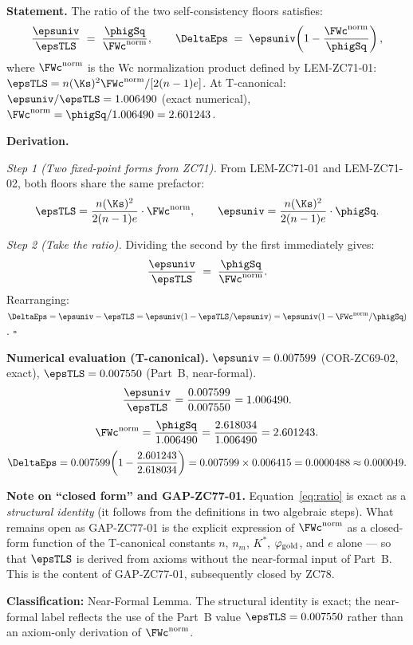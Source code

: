 \documentclass[12pt, a4paper]{article}
\begin{document}

\begin{formalbox}[title={LEM-ZC77-01: Two-Layer Floor Structural Form
  ($R_0$, Near-Formal)}]

\textbf{Statement.}
The ratio of the two self-consistency floors satisfies:
\begin{equation}
  \frac{\epsuniv}{\epsTLS}
  \;=\; \frac{\phigSq}{\FWc^{\rm norm}},
  \qquad
  \DeltaEps \;=\; \epsuniv\!\left(1 - \frac{\FWc^{\rm norm}}{\phigSq}\right),
  \label{eq:ratio}
\end{equation}
where $\FWc^{\rm norm}$ is the Wc normalization product defined by
LEM-ZC71-01: $\epsTLS = n(\Ks)^2\FWc^{\rm norm}/[2(n-1)e]$.
At T-canonical: $\epsuniv/\epsTLS = 1.006490$ (exact numerical),
$\FWc^{\rm norm} = \phigSq / 1.006490 = 2.601243$.

\textbf{Derivation.}

\textit{Step 1 (Two fixed-point forms from ZC71).}
From LEM-ZC71-01 and LEM-ZC71-02, both floors share the same prefactor:
\[
  \epsTLS  = \frac{n(\Ks)^2}{2(n-1)e}\cdot\FWc^{\rm norm},
  \qquad
  \epsuniv = \frac{n(\Ks)^2}{2(n-1)e}\cdot\phigSq.
\]

\textit{Step 2 (Take the ratio).}
Dividing the second by the first immediately gives:
\begin{equation}
  \frac{\epsuniv}{\epsTLS} \;=\; \frac{\phigSq}{\FWc^{\rm norm}}.
  \label{eq:ratio-step2}
\end{equation}
Rearranging: $\DeltaEps = \epsuniv - \epsTLS
= \epsuniv(1 - \epsTLS/\epsuniv)
= \epsuniv(1 - \FWc^{\rm norm}/\phigSq)$. \hfill$\square$

\textbf{Numerical evaluation (T-canonical).}
$\epsuniv = 0.007599$ (COR-ZC69-02, exact),
$\epsTLS = 0.007550$ (Part~B, near-formal).
\[
  \frac{\epsuniv}{\epsTLS} = \frac{0.007599}{0.007550} = 1.006490.
\]
\[
  \FWc^{\rm norm} = \frac{\phigSq}{1.006490}
  = \frac{2.618034}{1.006490} = 2.601243.
\]
\[
  \DeltaEps = 0.007599\!\left(1 - \frac{2.601243}{2.618034}\right)
  = 0.007599 \times 0.006415 = 0.0000488 \approx 0.000049.
\]

\textbf{Note on ``closed form'' and GAP-ZC77-01.}
Equation~\eqref{eq:ratio} is exact as a \emph{structural identity}
(it follows from the definitions in two algebraic steps).
What remains open as GAP-ZC77-01 is the explicit expression of
$\FWc^{\rm norm}$ as a closed-form function of the T-canonical constants
$n$, $n_m$, $K^*$, $\varphi_{\rm gold}$, and $e$ alone --- so that
$\epsTLS$ is derived from axioms without the near-formal input of
Part~B. This is the content of GAP-ZC77-01, subsequently closed
by ZC78.

\textbf{Classification:} Near-Formal Lemma. The structural identity
is exact; the near-formal label reflects the use of the Part~B value
$\epsTLS = 0.007550$ rather than an axiom-only derivation of
$\FWc^{\rm norm}$.
\end{formalbox}
\end{document}
